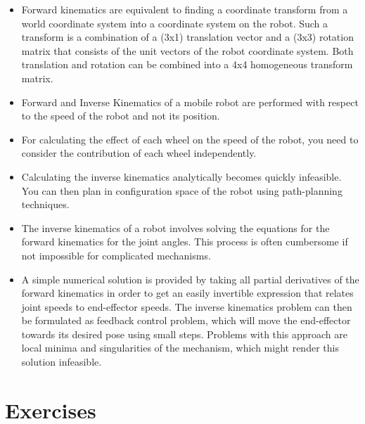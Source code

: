 \begin{itemize}
\item Forward kinematics are equivalent to finding a coordinate transform from a world coordinate system into a coordinate system on the robot. Such a transform is a combination of a (3x1) translation vector and a (3x3) rotation matrix that consists of the unit vectors of the robot coordinate system. Both translation and rotation can be combined into a 4x4 homogeneous transform matrix.
\item Forward and Inverse Kinematics of a mobile robot are performed with respect to the speed of the robot and not its position.
\item For calculating the effect of each wheel on the speed of the robot, you need to consider the contribution of each wheel independently.
\item Calculating the inverse kinematics analytically becomes quickly infeasible. You can then plan in configuration space of the robot using path-planning techniques.
\item The inverse kinematics of a robot involves solving the equations for the forward kinematics for the joint angles. This process is often cumbersome if not impossible for complicated mechanisms.
\item A simple numerical solution is provided by taking all partial derivatives of the forward kinematics in order to get an easily invertible expression that relates joint speeds to end-effector speeds.
The inverse kinematics problem can then be formulated as feedback control problem, which will move the end-effector towards its desired pose using small steps. Problems with this approach are local minima and singularities of the mechanism, which might render this solution infeasible.
\end{itemize}

\section*{Exercises}\small
